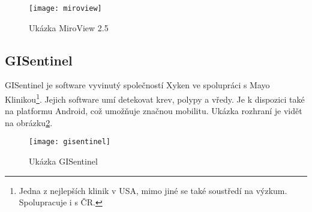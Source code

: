 \begin{figure}[!h]
	\texttt{[image: miroview]}
	\centering
	\caption{Ukázka MiroView 2.5\cite{miroview}\label{fig:miroview}}
\end{figure} 
\FloatBarrier
\clearpage
\subsection{GISentinel}
GISentinel je software vyvinutý společností Xyken ve spolupráci s Mayo Klinikou\footnote{Jedna z nejlepších klinik v USA, mimo jiné se také soustředí na výzkum. Spolupracuje i s ČR.\cite{about}}. Jejich software umí detekovat krev, polypy a vředy. Je k dispozici také na platformu Android, což umožňuje značnou mobilitu. Ukázka rozhraní je vidět na obrázku\ref{fig:gisentinel}.\cite{gisentinel}

\begin{figure}[h]
	\texttt{[image: gisentinel]}
	\centering
	\caption{Ukázka GISentinel\cite{gisentinel}\label{fig:gisentinel}}
\end{figure}
\FloatBarrier
\begin{comment}
\section{Specifikace biomedicínských dat}
Data z kamer jsou získána, jako sled obrázků. Každý výrobce má svůj specifický vetšinou uzavřený formát. Ve všech případech se ale jedná o RGB data, která zaznamenává přímo kamera.
\end{comment}